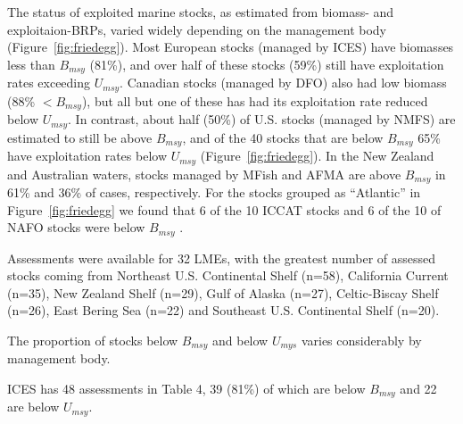 The status of exploited marine stocks, as estimated from biomass- and
exploitaion-BRPs, varied widely depending on the management body
(Figure~\ref{fig:friedegg}). Most European stocks (managed by
ICES) have biomasses less than $B_{msy}$
(81\%), and over half of these
stocks (59\%) still
have exploitation rates exceeding $U_{msy}$. Canadian stocks (managed
by DFO) also had low biomass (88\%
$< B_{msy}$), but all but one of these has had its exploitation rate
reduced below $U_{msy}$. In contrast, about half
(50\%) of U.S. stocks (managed by
NMFS) are estimated to still be above $B_{msy}$, and of the
40 stocks that are below $B_{msy}$
65\% have exploitation
rates below $U_{msy}$ (Figure~\ref{fig:friedegg}). In the New
Zealand and Australian waters, stocks managed by MFish and AFMA are
above $B_{msy}$ in 61\% and
36\% of cases, respectively. For
the stocks grouped as ``Atlantic'' in Figure~\ref{fig:friedegg} we
found that 6 of the
10 ICCAT stocks and
6 of the
10 of NAFO stocks were below $B_{msy}$ .



Assessments were available for 32 LMEs, with the greatest number of
assessed stocks coming from Northeast U.S. Continental Shelf (n=58),
California Current (n=35), New Zealand Shelf (n=29),
Gulf of Alaska (n=27), Celtic-Biscay Shelf (n=26), East Bering Sea (n=22)
and Southeast U.S. Continental Shelf (n=20).

The proportion of stocks below $B_{msy}$ and below $U_{mys}$ varies considerably by management body. 

ICES has 48 assessments in Table 4,
39
(81\%) of which are below
$B_{msy}$ and 22 are below
$U_{msy}$.
